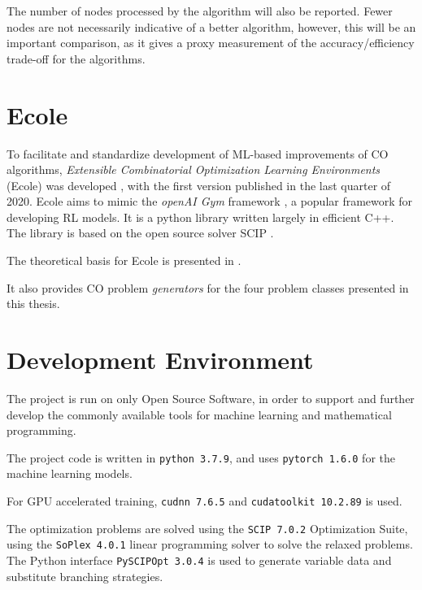 The number of nodes processed by the algorithm will also be reported. Fewer nodes are not necessarily indicative of a better algorithm, however, this will be an important comparison, as it gives a proxy measurement of the accuracy/efficiency trade-off for the algorithms. 


\section{Ecole}\label{sec:ecole}

To facilitate and standardize development of \gls{ML}-based improvements of \gls{CO} algorithms, \textit{Extensible Combinatorial Optimization Learning Environments} (\gls{Ecole}) was developed \cite{prouvost2020ecole}, with the first version published in the last quarter of 2020. \gls{Ecole} aims to mimic the \textit{openAI Gym} framework \cite{brockman2016openai}, a popular framework for developing \gls{RL} models. It is a python library written largely in efficient C++. 
The library is based on the open source solver \gls{SCIP} \cite{achterberg2009scip}.

The theoretical basis for \gls{Ecole} is presented in . 

It also provides \gls{CO} problem \textit{generators} for the four problem classes presented in this thesis.

\section{Development Environment}

The project is run on only Open Source Software, in order to support and further develop the commonly available tools for machine learning and mathematical programming. 

The project code is written in 
\verb|python 3.7.9|, and uses               
\verb|pytorch 1.6.0| for the machine learning models.           

For \gls{GPU} accelerated training, 
\verb|cudnn 7.6.5| and 
\verb|cudatoolkit 10.2.89| is used. 

The optimization problems are solved using the \verb|SCIP 7.0.2| Optimization Suite, using the 
\verb|SoPlex 4.0.1| linear programming solver to solve the relaxed problems. The Python interface
\verb|PySCIPOpt 3.0.4| is used to generate variable data and substitute branching strategies.
